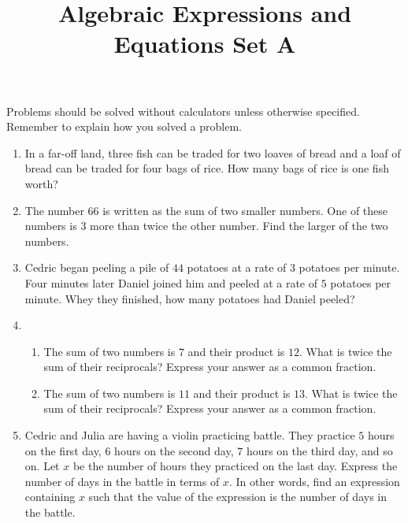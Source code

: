 \documentclass{article}
\title{Algebraic Expressions and Equations Set A}
\author{}
\date{}
\begin{document}
    \maketitle
    \noindent Problems should be solved without calculators unless otherwise
    specified. Remember to explain how you solved a problem.
    \begin{enumerate}
        \item In a far-off land, three fish can be traded for two loaves of
        bread and a loaf of bread can be traded for four bags of rice. How many
        bags of rice is one fish worth?
        \vspace{3cm}
        \item The number $66$ is written as the sum of two smaller numbers. One
        of these numbers is $3$ more than twice the other number. Find the
        larger of the two numbers.
        \vspace{3cm}
        \item Cedric began peeling a pile of $44$ potatoes at a rate of $3$
        potatoes per minute. Four minutes later Daniel joined him and peeled at
        a rate of $5$ potatoes per minute. Whey they finished, how many potatoes
        had Daniel peeled?
        \vspace{3cm}
        \item \begin{enumerate}
            \item The sum of two numbers is $7$ and their product is $12$. What
            is twice the sum of their reciprocals? Express your answer as a
            common fraction.
            \vspace{3cm}
            \item The sum of two numbers is $11$ and their product is $13$. What
            is twice the sum of their reciprocals? Express your answer as a
            common fraction.
            \vspace{3cm}
        \end{enumerate}
        \item Cedric and Julia are having a violin practicing battle. They
        practice $5$ hours on the first day, $6$ hours on the second day, $7$
        hours on the third day, and so on. Let $x$ be the number of hours they
        practiced on the last day. Express the number of days in the battle in
        terms of $x$. In other words, find an expression containing $x$ such
        that the value of the expression is the number of days in the battle.
        \vspace{3cm}
    \end{enumerate}
\end{document}

